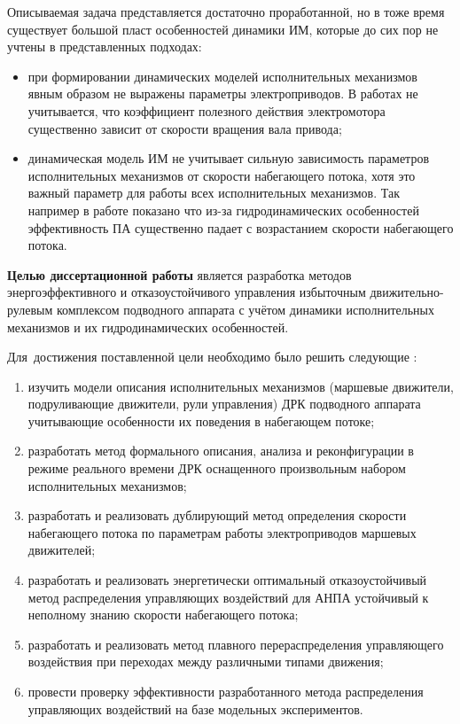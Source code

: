 Описываемая задача представляется достаточно проработанной, но в тоже время существует большой пласт особенностей динамики ИМ, которые до сих пор не учтены в представленных подходах:
\begin{itemize}
    \item при формировании динамических моделей исполнительных механизмов явным образом не выражены параметры электроприводов. В работах не учитывается, что коэффициент полезного действия электромотора существенно зависит от скорости вращения вала привода;
    \item динамическая модель ИМ не учитывает сильную зависимость параметров исполнительных механизмов от скорости набегающего потока, хотя это важный параметр для работы всех исполнительных механизмов. Так например в работе \cite{palmer2008modelling} показано что из-за гидродинамических особенностей эффективность ПА существенно падает с возрастанием скорости набегающего потока.
\end{itemize}

\textbf{Целью диссертационной работы} является разработка методов энергоэффективного и отказоустойчивого управления избыточным движительно-рулевым комплексом подводного аппарата с учётом динамики исполнительных механизмов и их гидродинамических особенностей.

Для~достижения поставленной цели необходимо было решить следующие {\tasks}:
\begin{enumerate}[beginpenalty=10000] %
  \item изучить модели описания исполнительных механизмов (маршевые движители, подруливающие движители, рули управления) ДРК подводного аппарата учитывающие особенности их поведения в набегающем потоке;
  \item разработать метод формального описания, анализа и реконфигурации в режиме реального времени ДРК оснащенного произвольным набором исполнительных механизмов;
  \item разработать и реализовать дублирующий метод определения скорости набегающего потока по параметрам работы электроприводов маршевых движителей;
  \item разработать и реализовать энергетически оптимальный отказоустойчивый метод распределения управляющих воздействий для АНПА устойчивый к неполному знанию скорости набегающего потока;
  \item разработать и реализовать метод плавного перераспределения управляющего воздействия при переходах между различными типами движения;
  \item провести проверку эффективности разработанного метода распределения управляющих воздействий на базе модельных экспериментов.
\end{enumerate}

